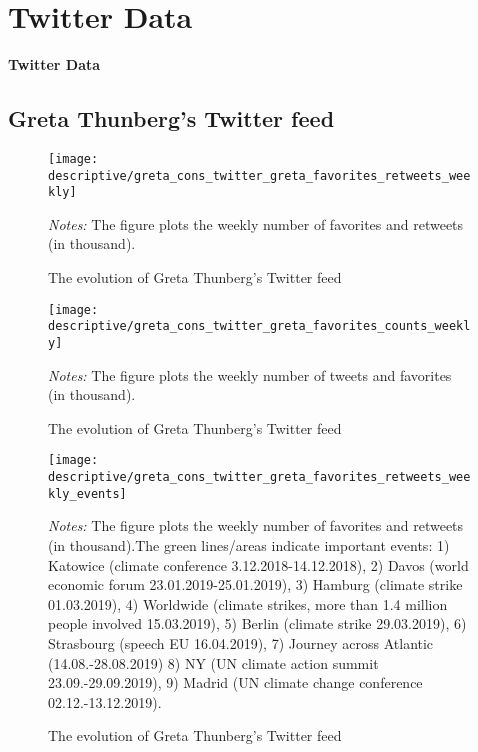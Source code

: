 \documentclass[11pt, a4paper]{article} %
\begin{document}
\newpage
\TODO\section{Twitter Data}
\vspace*{\fill}
{\Huge \begin{center}\textbf{Twitter Data}\end{center}}
\vspace*{\fill}\clearpage
\subsection{Greta Thunberg's Twitter feed}
\begin{figure}[H]\centering
	\caption{The evolution of Greta Thunberg's Twitter feed}
	\texttt{[image: descriptive/greta\_cons\_twitter\_greta\_favorites\_retweets\_weekly]}
	\begin{minipage}{\linewidth}
		\scriptsize{\emph{Notes:} The figure plots the weekly number of favorites and retweets (in thousand).}
	\end{minipage}
\end{figure}


\begin{figure}[H]\centering
	\caption{The evolution of Greta Thunberg's Twitter feed}
	\texttt{[image: descriptive/greta\_cons\_twitter\_greta\_favorites\_counts\_weekly]}
	\begin{minipage}{\linewidth}
		\scriptsize{\emph{Notes:} The figure plots the weekly number of tweets and favorites (in thousand).}
	\end{minipage}
\end{figure}

\begin{figure}[H]\centering
	\caption{The evolution of Greta Thunberg's Twitter feed}
	\texttt{[image: descriptive/greta\_cons\_twitter\_greta\_favorites\_retweets\_weekly\_events]}
	\begin{minipage}{\linewidth}
		\scriptsize{\emph{Notes:} The figure plots the weekly number of favorites and retweets (in thousand).The green lines/areas indicate important events: 1) Katowice (climate conference 3.12.2018-14.12.2018), 2) Davos (world economic forum 23.01.2019-25.01.2019), 3) Hamburg (climate strike 01.03.2019), 4) Worldwide (climate strikes, more than 1.4 million people involved 15.03.2019), 5) Berlin (climate strike 29.03.2019), 6) Strasbourg (speech EU 16.04.2019), 7) Journey across Atlantic (14.08.-28.08.2019) 8) NY (UN climate action summit 23.09.-29.09.2019), 9) Madrid (UN climate change conference 02.12.-13.12.2019).}
	\end{minipage}
\end{figure}
\end{document}
